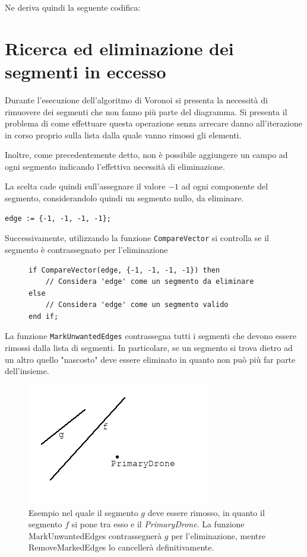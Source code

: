 \documentclass[11pt,a4paper]{report}
\newcommand{\modelicaclass}[1]{
	
}
\newcommand{\name}[1]{{\ttfamily #1}}
\begin{document}
Ne deriva quindi la seguente codifica:

\modelicaclass{CenterOfMass.mo}

\section{Ricerca ed eliminazione dei segmenti in eccesso}

Durante l'esecuzione dell'algoritmo di Voronoi si presenta la necessità di rimuovere dei segmenti che non fanno più parte del diagramma. Si presenta il problema di come effettuare questa operazione senza arrecare danno all'iterazione in corso proprio sulla lista dalla quale vanno rimossi gli elementi.

Inoltre, come precedentemente detto, non è possibile aggiungere un campo ad ogni segmento indicando l'effettiva necessità di eliminazione.

La scelta cade quindi sull'assegnare il valore $-1$ ad ogni componente del segmento, considerandolo quindi un segmento nullo, da eliminare.

\begin{lstlisting}[language=Modelica]
edge := {-1, -1, -1, -1};
\end{lstlisting}

Successivamente, utilizzando la funzione \verb|CompareVector| si controlla se il segmento è contrassegnato per l'eliminazione

\begin{figure}[H]
\begin{lstlisting}
if CompareVector(edge, {-1, -1, -1, -1}) then
	// Considera 'edge' come un segmento da eliminare
else
	// Considera 'edge' come un segmento valido
end if;
\end{lstlisting}
\end{figure}

La funzione \verb|MarkUnwantedEdges| contrassegna tutti i segmenti che devono essere rimossi dalla lista di segmenti. In particolare, se un segmento si trova dietro ad un altro quello "nascosto" deve essere eliminato in quanto non può più far parte dell'insieme.

\label{mark_unwanted_edges}

\begin{figure}[H]
\centering
\includegraphics[scale=0.7]{rimozione_segmento.png}
\caption{Esempio nel quale il segmento $g$ deve essere rimosso, in quanto il segmento $f$ si pone tra esso e il \textit{PrimaryDrone}. La funzione \name{MarkUnwantedEdges} contrassegnerà $g$ per l'eliminazione, mentre \name{RemoveMarkedEdges} lo cancellerà definitivamente.}
\end{figure}
\end{document}
